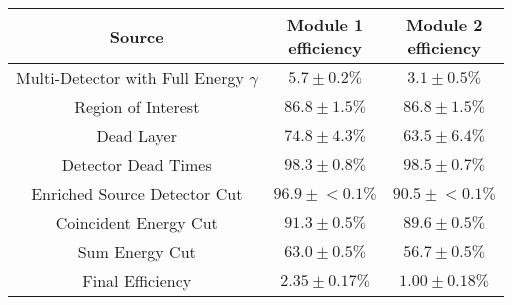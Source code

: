 \begin{tabular}{|c|c|c|}
\hline
  Source & \makecell{Module 1\\efficiency} & \makecell{Module 2\\efficiency} \\
\hline
  \makecell{Multi-Detector with\\Full Energy $\gamma$} & $5.7 \pm 0.2\%$ & $3.1 \pm 0.5\%$ \\
  Region of Interest & $86.8 \pm 1.5\%$ & $86.8 \pm 1.5\%$ \\
  Dead Layer & $74.8 \pm 4.3\%$ & $63.5 \pm 6.4\%$ \\
  Detector Dead Times & $98.3 \pm 0.8\%$ & $98.5 \pm 0.7\%$ \\
  Enriched Source Detector Cut & $96.9 \pm{}<\!0.1\%$ & $90.5 \pm{}<\!0.1\%$ \\
  Coincident Energy Cut & $91.3 \pm 0.5\%$ & $89.6 \pm 0.5\%$ \\
  Sum Energy Cut & $63.0 \pm 0.5\%$ & $56.7 \pm 0.5\%$ \\
  \hline Final Efficiency & $2.35 \pm 0.17\%$ & $1.00 \pm 0.18\%$ \\
\hline
\end{tabular}

